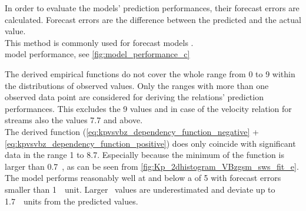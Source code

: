 In order to evaluate the models' prediction performances, their forecast errors are calculated. Forecast errors are the difference between the predicted and the actual value.\\

This method is commonly used for forecast models \citep{Wing2005}.\\

model performance, see \autoref{fig:model_performance_c}\\
\begin{figure}
\end{figure}


The derived empirical functions do not cover the whole \Kp{} range from 0 to 9 within the distributions of observed values. Only the \Kp{} ranges with more than one observed data point are considered for deriving the relations' prediction performances. This excludes the \Kp{} 9 values and in case of the velocity relation for streams also the \Kp{} values 7.7 and above.\\

The derived function (\ref{eq:kpvsvbz_dependency_function_negative} + \ref{eq:kpvsvbz_dependency_function_positive}) does only coincide with significant data in the \Kp{} range 1 to 8.7. Especially because the minimum of the \vBz{} function is larger than 0.7~\Kp{}, as can be seen from \autoref{fig:Kp_2dhistogram_VBzgsm_sws_fit_e}. The model performs reasonably well at and below a \Kp{} of 5 with forecast errors smaller than 1~\Kp~unit. Larger \Kp~values are underestimated and deviate up to 1.7~\Kp~units from the predicted values.\\

